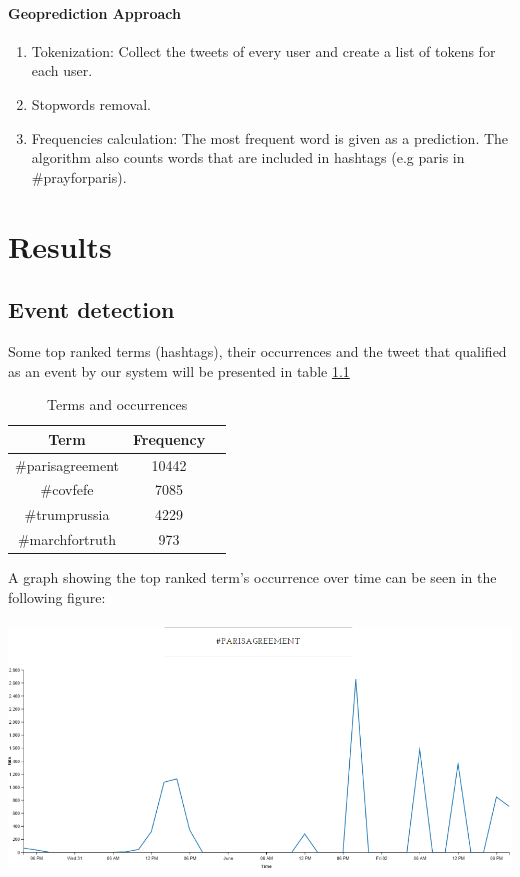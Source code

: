 \documentclass[12pt,svgnames]{report}
\begin{document}
\subsubsection*{Geoprediction Approach}
\begin{enumerate}
	\item Tokenization: Collect the tweets of every user and create a list of tokens for each user.
	\item Stopwords removal.
	\item Frequencies calculation: The most frequent word is given as a prediction. The algorithm also counts words that are included in hashtags (e.g paris in \#prayforparis).
\end{enumerate}

\chapter{Results}
\label{chap:results}
\section*{Event detection}
Some top ranked terms (hashtags), their occurrences and the tweet that qualified as an event by our system will be presented in table \ref{tab:tftags}

\begin{table}[h!]
	\centering

	\begin{tabular}{ccc}
		\toprule
		Term & Frequency\\
		\midrule
		\#parisagreement & 10442\\
		\#covfefe & 7085\\
		\#trumprussia & 4229\\
		\#marchfortruth & 973\\
		\bottomrule
	\end{tabular}
	\caption{Terms and occurrences}
\label{tab:tftags}
\end{table}


A graph showing the top ranked term's occurrence over time can be seen in the following figure:\\
\\
\includegraphics[scale=0.63]{hashparisplot.png}
\\
\end{document}
